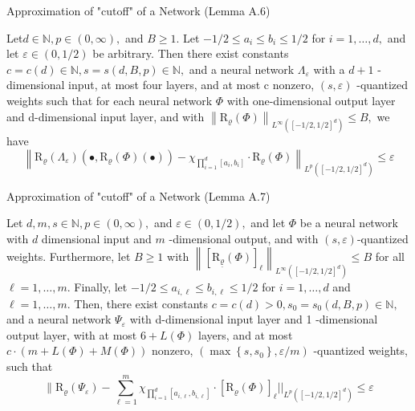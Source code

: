 \documentclass{if-beamer}
\begin{document}
\begin{frame}{Approximation of "cutoff" of a Network (Lemma A.6)}
    \begin{tcolorbox}
        Let$d \in \mathbb{N}, p \in(0, \infty),$ and $B \geq 1 .$ Let $-1 / 2 \leq a_{i} \leq b_{i} \leq 1 / 2$ for $i=1, \ldots, d,$ and let $\varepsilon \in(0,1 / 2)$ be arbitrary. Then there exist constants $c=c(d) \in \mathbb{N}, s=s(d, B, p) \in \mathbb{N},$ and a neural network $\Lambda_{\varepsilon}$ with a $d+1$ -dimensional input, at most four layers, and at most c nonzero, $(s, \varepsilon)$ -quantized weights such that for each neural network $\Phi$ with one-dimensional output layer and d-dimensional input layer, and with $\left\|\mathrm{R}_{\varrho}(\Phi)\right\|_{L^{\infty}\left([-1 / 2,1 / 2]^{d}\right)} \leq B,$ we have
        \[
        \left\|\mathrm{R}_{\varrho}\left(\Lambda_{\varepsilon}\right)\left(\bullet, \mathrm{R}_{\varrho}(\Phi)(\bullet)\right)-\chi_{\prod_{i=1}^{d}\left[a_{i}, b_{i}\right]} \cdot \mathrm{R}_{\varrho}(\Phi)\right\|_{L^{p}\left([-1 / 2,1 / 2]^{d}\right)} \leq \varepsilon
        \]
    \end{tcolorbox}
\end{frame}

\begin{frame}{Approximation of "cutoff" of a Network (Lemma A.7)}
    \begin{tcolorbox}
        Let $d, m, s \in \mathbb{N}, p \in(0, \infty),$ and $\varepsilon \in(0,1 / 2),$ and let $\Phi$ be a neural network with $d$ dimensional input and $m$ -dimensional output, and with $(s, \varepsilon)$-quantized weights. Furthermore, let $B \geq 1$ with $\left\|\left[\mathrm{R}_{\underline{\varrho}}(\Phi)\right]_{\ell}\right\|_{L^{\infty}\left([-1 / 2,1 / 2]^{d}\right)} \leq B$ for all $\ell=1, \ldots, m .$ Finally, let $-1 / 2 \leq a_{i, \ell} \leq b_{i, \ell} \leq 1 / 2$ for $i=1, \ldots, d$ and  $\ell=1, \ldots, m$.
        Then, there exist constants $c=c(d)>0, s_{0}=s_{0}(d, B, p) \in \mathbb{N},$ and a neural network $\Psi_{\varepsilon}$ with d-dimensional input layer and 1 -dimensional output layer, with at most $6+L(\Phi)$ layers, and at most $c \cdot(m+L(\Phi)+M(\Phi))$ nonzero, $\left(\max \left\{s, s_{0}\right\}, \varepsilon / m\right)$ -quantized weights, such that
        \[
        \| \mathrm{R}_{\varrho}\left(\Psi_{\varepsilon}\right)-\sum_{\ell=1}^{m} \chi_{\prod_{i=1}^{d}\left[a_{i, \ell}, b_{i, \ell}\right]} \cdot\left[\mathrm{R}_{\varrho}(\Phi)\right]_{\ell}||_{L^{p}\left([-1 / 2,1 / 2]^{d}\right)} \leq \varepsilon
        \]
    \end{tcolorbox}
\end{frame}
\end{document}
